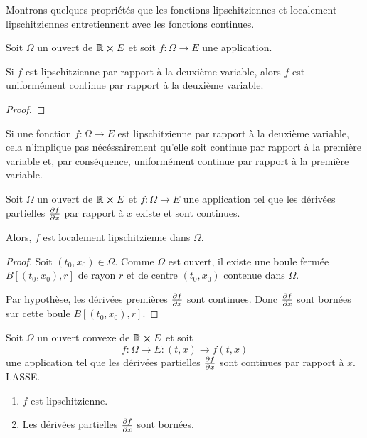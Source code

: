 \documentclass[a4paper, 11pt]{report}
\begin{document}
	Montrons quelques propriétés que les fonctions lipschitziennes et localement
	lipschitziennes entretiennent avec les fonctions continues.

	\begin{proposition}
		Soit $\Omega$ un ouvert de $\mathbb{R} \cross E$ et soit $f :
		\Omega \rightarrow E$ une application.

		Si $f$ est lipschitzienne par rapport à la deuxième variable, alors $f$
		est uniformément continue par rapport à la deuxième variable.
	\end{proposition}

	\ifdefined\outputproof
	\begin{proof}

	\end{proof}
	\fi

	\begin{remarque}
		Si une fonction $f : \Omega \rightarrow E$ est lipschitzienne
		par rapport à la deuxième variable, cela n'implique pas nécéssairement
		qu'elle soit continue par rapport à la première variable et, par
		conséquence, uniformément continue par rapport à la première variable.
	\end{remarque}

	\begin{proposition}
		Soit $\Omega$ un ouvert de $\mathbb{R} \cross E$ et $f : \Omega
		\rightarrow E$ une application tel que les dérivées partielles
		$\pdv{f}{x}$ par rapport à $x$ existe et sont continues.

		Alors, $f$ est localement lipschitzienne dans $\Omega$.
	\end{proposition}

	\ifdefined\outputproof
	\begin{proof}
		Soit $(t_{0}, x_{0}) \in \Omega$. Comme $\Omega$ est ouvert, il
		existe une boule fermée $B[ (t_{0}, x_{0}), r]$ de rayon $r$ et de
		centre $(t_{0}, x_{0})$ contenue dans $\Omega$.

		Par hypothèse, les dérivées premières $\pdv{f}{x}$ sont continues.
		Donc $\pdv{f}{x}$ sont bornées sur cette boule $B[ (t_{0},
		x_{0}), r]$.
	\end{proof}
	\fi

	\begin{proposition}
		Soit $\Omega$ un ouvert convexe de $\mathbb{R} \cross E$ et soit
		\begin{equation}
			f : \Omega \rightarrow E : (t, x) \rightarrow f(t,
			x)
		\end{equation}
		une application tel que les dérivées
		partielles $\pdv{f}{x}$ sont continues par rapport à $x$.
		LASSE.
		\begin{enumerate}
			\item $f$ est lipschitzienne.
			\item Les dérivées partielles $\pdv{f}{x}$ sont bornées.
		\end{enumerate}
	\end{proposition}
\end{document}
